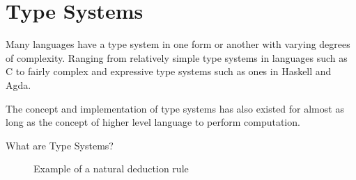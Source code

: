 \section{Type Systems}

Many languages have a type system in one form or another with varying degrees of complexity.
Ranging from relatively simple type systems in languages such as C to fairly complex and expressive type systems such as ones in Haskell and Agda.

The concept and implementation of type systems has also existed for almost as long as the concept of higher level language to perform computation.

What are Type Systems?



\begin{figure}
    \begin{prooftree}
    \end{prooftree}
    \caption{Example of a natural deduction rule}
\end{figure}
